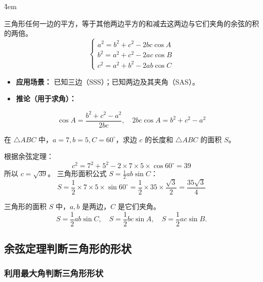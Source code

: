 \v{4em}

\begin{theorem}[余弦定理]
    三角形任何一边的平方，等于其他两边平方的和减去这两边与它们夹角的余弦的积的两倍。
    $$
        \begin{cases}
            a^2 = b^2 + c^2 - 2bc \cos A \\
            b^2 = a^2 + c^2 - 2ac \cos B \\
            c^2 = a^2 + b^2 - 2ab \cos C
        \end{cases}
    $$
    \begin{itemize}
        \item \textbf{应用场景：} 已知三边（SSS）；已知两边及其夹角（SAS）。
        \item \textbf{推论（用于求角）：}
    \end{itemize}
    $$
        \cos A = \frac{b^2 + c^2 - a^2}{2bc}, \quad 2bc \cos A = b^2 + c^2 - a^2
    $$
\end{theorem}

\begin{example}
    在 $\triangle ABC$ 中，$a=7, b=5, C=60^\circ$，求边 $c$ 的长度和 $\triangle ABC$ 的面积 $S$。
\end{example}
\begin{solution}
    根据余弦定理：
    $$
        c^2 = 7^2 + 5^2 - 2 \times 7 \times 5 \times \cos 60^\circ = 39
    $$
    所以 $c = \sqrt{39}$。
    三角形面积公式 $S = \frac{1}{2}ab \sin C$：
    $$
        S = \frac{1}{2} \times 7 \times 5 \times \sin 60^\circ = \frac{1}{2} \times 35 \times \frac{\sqrt{3}}{2} = \frac{35\sqrt{3}}{4}
    $$
\end{solution}

\begin{theorem}[三角形面积公式]
    三角形的面积 $S$ 中，$a, b$ 是两边，$C$ 是它们夹角。
    $$
        S = \frac{1}{2}ab \sin C, \quad S = \frac{1}{2}bc \sin A, \quad S = \frac{1}{2}ac \sin B.
    $$

\end{theorem}

\subsection{余弦定理判断三角形的形状}

\subsubsection{利用最大角判断三角形形状}

